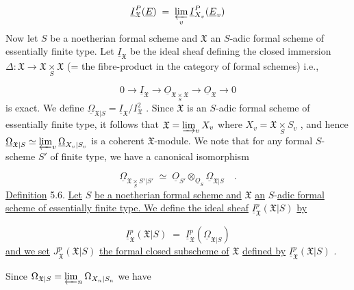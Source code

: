 \begin{equation*}
\underline{I}^P_{\mathfrak{X}}(\underline{E}) \;=\; \varprojlim_{v} \underline{I}^P_{X_v}(\underline{E}_v)
\end{equation*}
Now let $S$ be a noetherian formal scheme and $\mathfrak{X}$ an $S$-adic formal scheme of essentially finite type. Let $\underline{I}_{\mathfrak{X}}$ be the ideal sheaf defining the closed immersion $\Delta : \mathfrak{X} \to \mathfrak{X} \underset{S}{\times} \mathfrak{X}$ (= the fibre-product in the category of formal schemes) i.e.,

\begin{equation*}
0 \to \underline{I}_{\mathfrak{X}} \to \underline{O}_{\mathfrak{X} \underset{S}{\times} \mathfrak{X}} \to \underline{O}_{\mathfrak{X}} \to 0
\end{equation*}
is exact. We define $\underline{\Omega}_{\mathfrak{X}|S} = \underline{I}_{\mathfrak{X}}/I^2_{\mathfrak{X}}$ . Since $\mathfrak{X}$ is an $S$-adic formal scheme of essentially finite type, it follows that $\mathfrak{X} = \varinjlim_{v} X_v$ where $X_v = \mathfrak{X} \underset{S}{\times} S_v$ , and hence $\underline{\Omega}_{\mathfrak{X}|S} \simeq \varprojlim_{v} \underline{\Omega}_{X_v|S_v}$ is a coherent $\mathfrak{X}$-module. We note that for any formal $S$-scheme $S'$ of finite type, we have a canonical isomorphism

\begin{equation*}
\underline{\Omega}_{\mathfrak{X} \underset{S}{\times} S'|S'} \;\simeq\; \underline{O}_{S'} \otimes_{\underline{O}_S} \underline{\Omega}_{\mathfrak{X}|S} \quad .
\end{equation*}
\underline{Definition} 5.6. \underline{Let} $S$ \underline{be a noetherian formal scheme and} $\mathfrak{X}$ \underline{an} $S$-\underline{adic formal scheme of essentially finite type. We define the ideal sheaf} $\underline{I}^p_{\mathfrak{X}}(\mathfrak{X}|S)$ \underline{by}

\begin{equation*}
\underline{I}^p_{\mathfrak{X}}(\mathfrak{X}|S) \;=\; \underline{I}^p_{\mathfrak{X}}(\underline{\Omega}_{\mathfrak{X}|S})
\end{equation*}
\underline{and we set} $J^p_{\mathfrak{X}}(\mathfrak{X}|S)$ \underline{the formal closed subscheme of} $\mathfrak{X}$ \underline{defined by} $\underline{I}^p_{\mathfrak{X}}(\mathfrak{X}|S)$ .

Since $\Omega_{\mathfrak{X}|S} = \varprojlim_{n} \Omega_{X_n|S_n}$ we have 



